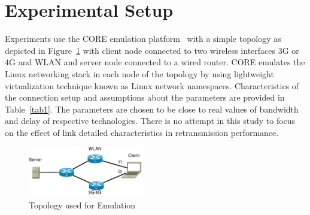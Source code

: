 \documentclass[10pt,conference,compsoc]{IEEEtran}
\begin{document}
\section{Experimental Setup}\label{exsetup}

Experiments use the CORE emulation platform~\cite{CORE} with a simple topology as depicted in Figure~\ref{fig1}
with client node connected to two wireless interfaces 3G or 4G and WLAN and server node connected to a wired router.
CORE emulates the Linux networking stack in each node of the topology by using lightweight virtualization technique known as Linux network namespaces.
Characteristics of the connection setup and assumptions about the parameters are provided in Table~\ref{tab1}.
The parameters are chosen to be close to real values of bandwidth and delay of respective technologies.
There is no attempt in this study to focus on the effect of link detailed characteristics in retransmission performance.

 
\begin{figure}[!ht]
\begin{center}
\includegraphics[angle=0, width=0.45\textwidth]{images/fortest.pdf}
\caption{Topology used for Emulation}\label{fig1}
\end{center}
\end{figure}
\begin{center}

\begin{table}
\end{table}
\end{center}
\end{document}
